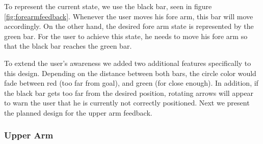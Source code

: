 

To represent the current state, we use the black bar, seen in figure \ref{fig:forearmfeedback}. Whenever the user moves his fore arm, this bar will move accordingly.
On the other hand, the desired fore arm state is represented by the green bar. 
For the user to achieve this state, he needs to move his fore arm so that the black bar reaches the green bar.

To extend the user's awareness we added two additional features specifically to this design. 
Depending on the distance between both bars, the circle color would fade between red (too far from goal), and green (for close enough). 
In addition, if the black bar gets too far from the desired position, rotating arrows will appear to warn the user that he is currently not correctly positioned. 
Next we present the planned design for the upper arm feedback.

\subsubsection{Upper Arm}



